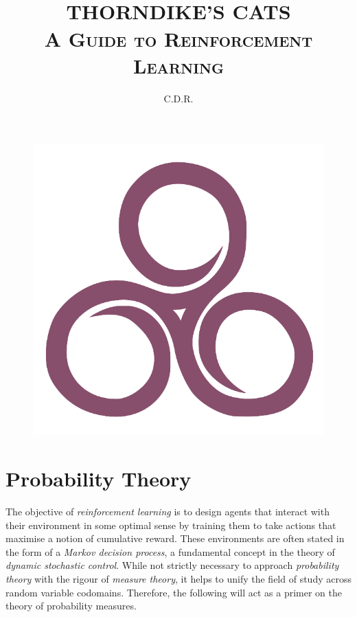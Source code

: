 \documentclass[a4paper,11pt,oneside]{book}
\title{
	     \HRule{1pt} \\ [0.2cm] %
	     \LARGE \textbf{\uppercase{Thorndike's Cats}} %
	     \HRule{1pt} \\ [0.5cm] %
	     \normalsize \textsc{A Guide to Reinforcement Learning} \\ [3cm] %
}
\author{C.D.R.\\}
\makeatletter
\def\printtitle{{\centering \@title\par}}
\def\printauthor{{\centering \large \@author}}
\theoremstyle{plain}
\theoremstyle{definition}
\makeatother
\begin{document}
\thispagestyle{empty} %
\pagecolor{bblue}\afterpage{\nopagecolor}

\printtitle %
\begin{figure}[hbtp]
\centering
\includegraphics[scale=0.4]{illusion.png}
\end{figure}
\vfill
\printauthor %
\newpage
\tableofcontents
\thispagestyle{empty}
\pagebreak
\setcounter{page}{1}
\chapter{Probability Theory}
The objective of \emph{reinforcement learning} is to design agents that interact with their environment in some optimal sense by training them to take actions that maximise a notion of cumulative reward. These environments are often stated in the form of a \emph{Markov decision process}, a fundamental concept in the theory of \emph{dynamic stochastic control}. While not strictly necessary to approach \emph{probability theory} with the rigour of \emph{measure theory}, it helps to unify the field of study across random variable codomains. Therefore, the following will act as a primer on the theory of probability measures.
\end{document}
